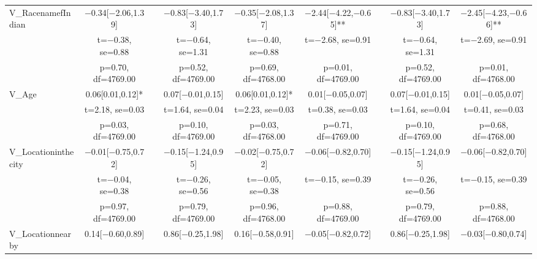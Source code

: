 \documentclass[]{report}
\begin{document}
\begin{table}
{\begin{tabular}[t]{lcccccccc}
		V\_RacenamefIndian & \num{-0.34}[\num{-2.06},\num{1.39}] &  & \num{-0.83}[\num{-3.40},\num{1.73}] & \num{-0.35}[\num{-2.08},\num{1.37}] & \num{-2.44}[\num{-4.22},\num{-0.65}]** &  & \num{-0.83}[\num{-3.40},\num{1.73}] & \num{-2.45}[\num{-4.23},\num{-0.66}]**\\
		& t=\num{-0.38}, se=\num{0.88} &  & t=\num{-0.64}, se=\num{1.31} & t=\num{-0.40}, se=\num{0.88} & t=\num{-2.68}, se=\num{0.91} &  & t=\num{-0.64}, se=\num{1.31} & t=\num{-2.69}, se=\num{0.91}\\
		& p=\num{0.70}, df=\num{4769.00} &  & p=\num{0.52}, df=\num{4769.00} & p=\num{0.69}, df=\num{4768.00} & p=\num{0.01}, df=\num{4769.00} &  & p=\num{0.52}, df=\num{4769.00} & p=\num{0.01}, df=\num{4768.00}\\
		V\_Age & \num{0.06}[\num{0.01},\num{0.12}]* &  & \num{0.07}[\num{-0.01},\num{0.15}] & \num{0.06}[\num{0.01},\num{0.12}]* & \num{0.01}[\num{-0.05},\num{0.07}] &  & \num{0.07}[\num{-0.01},\num{0.15}] & \num{0.01}[\num{-0.05},\num{0.07}]\\
		& t=\num{2.18}, se=\num{0.03} &  & t=\num{1.64}, se=\num{0.04} & t=\num{2.23}, se=\num{0.03} & t=\num{0.38}, se=\num{0.03} &  & t=\num{1.64}, se=\num{0.04} & t=\num{0.41}, se=\num{0.03}\\
		& p=\num{0.03}, df=\num{4769.00} &  & p=\num{0.10}, df=\num{4769.00} & p=\num{0.03}, df=\num{4768.00} & p=\num{0.71}, df=\num{4769.00} &  & p=\num{0.10}, df=\num{4769.00} & p=\num{0.68}, df=\num{4768.00}\\
		V\_Locationinthecity & \num{-0.01}[\num{-0.75},\num{0.72}] &  & \num{-0.15}[\num{-1.24},\num{0.95}] & \num{-0.02}[\num{-0.75},\num{0.72}] & \num{-0.06}[\num{-0.82},\num{0.70}] &  & \num{-0.15}[\num{-1.24},\num{0.95}] & \num{-0.06}[\num{-0.82},\num{0.70}]\\
		& t=\num{-0.04}, se=\num{0.38} &  & t=\num{-0.26}, se=\num{0.56} & t=\num{-0.05}, se=\num{0.38} & t=\num{-0.15}, se=\num{0.39} &  & t=\num{-0.26}, se=\num{0.56} & t=\num{-0.15}, se=\num{0.39}\\
		& p=\num{0.97}, df=\num{4769.00} &  & p=\num{0.79}, df=\num{4769.00} & p=\num{0.96}, df=\num{4768.00} & p=\num{0.88}, df=\num{4769.00} &  & p=\num{0.79}, df=\num{4769.00} & p=\num{0.88}, df=\num{4768.00}\\
		V\_Locationnearby & \num{0.14}[\num{-0.60},\num{0.89}] &  & \num{0.86}[\num{-0.25},\num{1.98}] & \num{0.16}[\num{-0.58},\num{0.91}] & \num{-0.05}[\num{-0.82},\num{0.72}] &  & \num{0.86}[\num{-0.25},\num{1.98}] & \num{-0.03}[\num{-0.80},\num{0.74}]\\

\end{tabular}}
\end{table}
\end{document}
